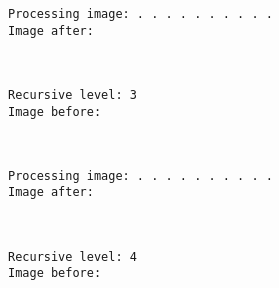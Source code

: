 \documentclass[11pt]{article}
\begin{document}
    \begin{Verbatim}[commandchars=\\\{\}]
Processing image: . . . . . . . . . . 
Image after:

    \end{Verbatim}

    \begin{center}
    \end{center}
    { \hspace*{\fill} \\}
    
    \begin{Verbatim}[commandchars=\\\{\}]
Recursive level: 3
Image before:

    \end{Verbatim}

    \begin{center}
    \end{center}
    { \hspace*{\fill} \\}
    
    \begin{Verbatim}[commandchars=\\\{\}]
Processing image: . . . . . . . . . . 
Image after:

    \end{Verbatim}

    \begin{center}
    \end{center}
    { \hspace*{\fill} \\}
    
    \begin{Verbatim}[commandchars=\\\{\}]
Recursive level: 4
Image before:

    \end{Verbatim}

    \begin{center}
    \end{center}
    { \hspace*{\fill} \\}
    
\end{document}
